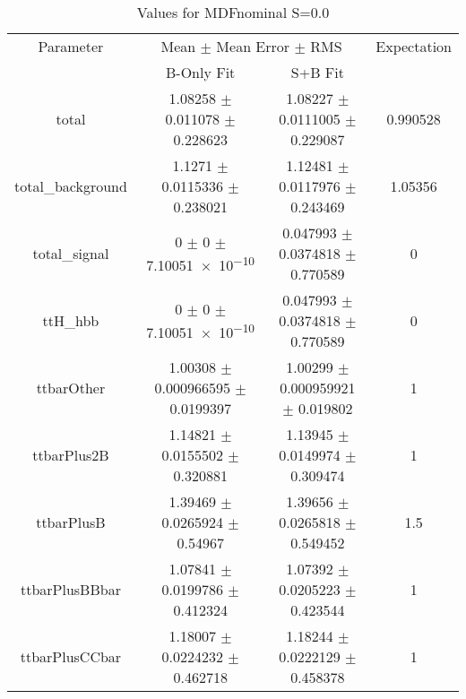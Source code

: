 \begin{table}
\centering
\caption{Values for MDFnominal S=0.0}
\begin{tabular}{cccc}
\toprule
Parameter & \multicolumn{2}{c}{Mean $\pm$ Mean Error $\pm$ RMS} & Expectation\\
 & B-Only Fit & S+B Fit & \\
\midrule
total & \num{1.08258} $\pm$ \num{0.011078} $\pm$ \num{0.228623} & \num{1.08227} $\pm$ \num{0.0111005} $\pm$ \num{0.229087} & \num{0.990528}\\
total\_background & \num{1.1271} $\pm$ \num{0.0115336} $\pm$ \num{0.238021} & \num{1.12481} $\pm$ \num{0.0117976} $\pm$ \num{0.243469} & \num{1.05356}\\
total\_signal & \num{0} $\pm$ \num{0} $\pm$ \num{7.10051e-10} & \num{0.047993} $\pm$ \num{0.0374818} $\pm$ \num{0.770589} & \num{0}\\
ttH\_hbb & \num{0} $\pm$ \num{0} $\pm$ \num{7.10051e-10} & \num{0.047993} $\pm$ \num{0.0374818} $\pm$ \num{0.770589} & \num{0}\\
ttbarOther & \num{1.00308} $\pm$ \num{0.000966595} $\pm$ \num{0.0199397} & \num{1.00299} $\pm$ \num{0.000959921} $\pm$ \num{0.019802} & \num{1}\\
ttbarPlus2B & \num{1.14821} $\pm$ \num{0.0155502} $\pm$ \num{0.320881} & \num{1.13945} $\pm$ \num{0.0149974} $\pm$ \num{0.309474} & \num{1}\\
ttbarPlusB & \num{1.39469} $\pm$ \num{0.0265924} $\pm$ \num{0.54967} & \num{1.39656} $\pm$ \num{0.0265818} $\pm$ \num{0.549452} & \num{1.5}\\
ttbarPlusBBbar & \num{1.07841} $\pm$ \num{0.0199786} $\pm$ \num{0.412324} & \num{1.07392} $\pm$ \num{0.0205223} $\pm$ \num{0.423544} & \num{1}\\
ttbarPlusCCbar & \num{1.18007} $\pm$ \num{0.0224232} $\pm$ \num{0.462718} & \num{1.18244} $\pm$ \num{0.0222129} $\pm$ \num{0.458378} & \num{1}\\
\bottomrule
\end{tabular}
\end{table}